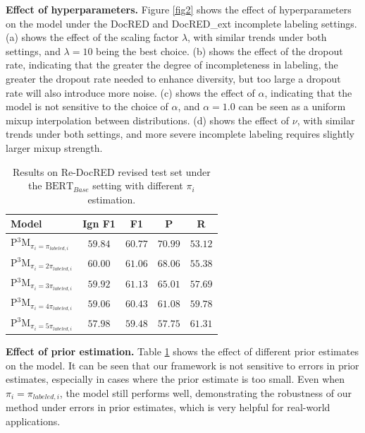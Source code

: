 \documentclass[11pt]{article}
\begin{document}
\textbf{Effect of hyperparameters.} \enspace Figure \ref{fig2} shows the effect of hyperparameters on the model under the DocRED and DocRED\_ext incomplete labeling settings. (a) shows the effect of the scaling factor $\lambda$, with similar trends under both settings, and $\lambda=10$ being the best choice. (b) shows the effect of the dropout rate, indicating that the greater the degree of incompleteness in labeling, the greater the dropout rate needed to enhance diversity, but too large a dropout rate will also introduce more noise. (c) shows the effect of $\alpha$, indicating that the model is not sensitive to the choice of $\alpha$, and $\alpha=1.0$ can be seen as a uniform mixup interpolation between distributions. (d) shows the effect of $\nu$, with similar trends under both settings, and more severe incomplete labeling requires slightly larger mixup strength.





\begin{table}
\centering
\small
\begin{tabular}{lcccc}
\toprule \textbf{Model} & Ign F1 & F1 & P & R \\
\midrule
P$^{3}$M$_{\pi_{i}=\pi_{labeled,i}}$& $59.84$ & $60.77$ & $70.99$ & $53.12$ \\
P$^{3}$M$_{\pi_{i}=2\pi_{labeled,i}}$ & $60.00$ & $61.06$ & $68.06$ & $55.38$ \\
P$^{3}$M$_{\pi_{i}=3\pi_{labeled,i}}$ & $59.92$ & $61.13$ & $65.01$ & $57.69$ \\
P$^{3}$M$_{\pi_{i}=4\pi_{labeled,i}}$ & $59.06$ & $60.43$ & $61.08$ & $59.78$ \\
P$^{3}$M$_{\pi_{i}=5\pi_{labeled,i}}$ & $57.98$ & $59.48$ & $57.75$ & $61.31$ \\
\bottomrule
\end{tabular}
\caption{\label{tab5}
Results on Re-DocRED revised test set under the $\mathrm{BERT}_{Base}$ setting with different $\pi_{i}$ estimation.
}
\end{table}

\textbf{Effect of prior estimation.} \enspace Table \ref{tab5} shows the effect of different prior estimates on the model. It can be seen that our framework is not sensitive to errors in prior estimates, especially in cases where the prior estimate is too small. Even when $\pi_{i}=\pi_{labeled,i}$, the model still performs well, demonstrating the robustness of our method under errors in prior estimates, which is very helpful for real-world applications.
\end{document}

